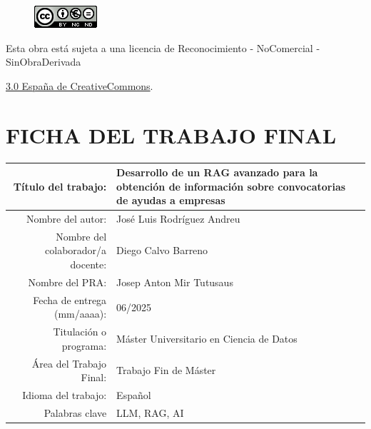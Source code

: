 \setcounter{page}{1} 
\pagestyle{plain}




\vspace{1cm}

\begin{figure}[ht]
    \centering
	\includegraphics[scale=1]{images/license.png}
\end{figure}

Esta obra está sujeta a una licencia de Reconocimiento -  NoComercial - SinObraDerivada

\href{https://creativecommons.org/licenses/by-nc-nd/3.0/es/}{3.0 España de CreativeCommons}.

\chapter*{FICHA DEL TRABAJO FINAL}

\begin{table}[ht]
	\centering{}
	\renewcommand{\arraystretch}{2}
	\begin{tabular}{r | l}
		\hline
		Título del trabajo: & Desarrollo de un RAG avanzado para la obtención 
		de información sobre convocatorias de ayudas a empresas\\
		\hline
        Nombre del autor: & José Luis Rodríguez Andreu\\
		\hline
        Nombre del colaborador/a docente: & Diego Calvo Barreno\\
		\hline
        Nombre del PRA: & Josep Anton Mir Tutusaus\\
		\hline
        Fecha de entrega (mm/aaaa): & 06/2025\\
		\hline
        Titulación o programa: & Máster Universitario en Ciencia de Datos\\
		\hline
        Área del Trabajo Final: & Trabajo Fin de Máster\\
		\hline
        Idioma del trabajo: & Español\\
		\hline
        Palabras clave & LLM, RAG, AI\\
		\hline
	\end{tabular}
\end{table}

